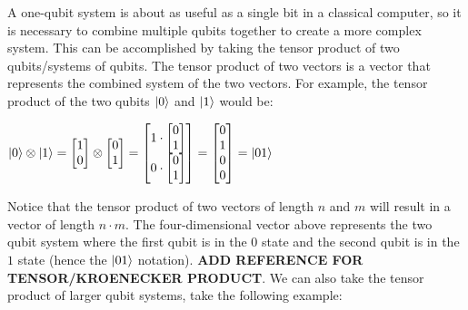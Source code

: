 \documentclass{article}
\begin{document}
A one-qubit system is about as useful as a single bit in a classical computer, so it is necessary to combine multiple qubits together to create a more complex system. This can
be accomplished by taking the tensor product of two qubits/systems of qubits. The tensor product of two vectors is a vector that represents the combined system of the two
vectors. For example, the tensor product of the two qubits $\ket{0}$ and $\ket{1}$ would be:

\begin{center}
	$
	\ket{0} \otimes \ket{1} =
	\begin{bmatrix}
		1 \\
		0 \\
	\end{bmatrix}
	\otimes
	\begin{bmatrix}
		0 \\
		1 \\
	\end{bmatrix}
	=
	\begin{bmatrix}
		1 \cdot
		\begin{bmatrix}
			0 \\
			1 \\
		\end{bmatrix} \\
		0 \cdot 
		\begin{bmatrix}
			0 \\
			1 \\
		\end{bmatrix} \\
	\end{bmatrix}
	=
	\begin{bmatrix}
		0 \\
		1 \\
		0 \\
		0 \\
	\end{bmatrix}
	=
	\ket{01}
	$
\end{center}

Notice that the tensor product of two vectors of length $n$ and $m$ will result in a vector of length $n \cdot m$. The four-dimensional vector above represents the two qubit 
system where the first qubit is in the $0$ state and the second qubit is in the $1$ state (hence the $\ket{01}$ notation). \textbf{ADD REFERENCE FOR TENSOR/KROENECKER PRODUCT}. 
We can also take the tensor product of larger qubit systems, take the following example:
\end{document}

